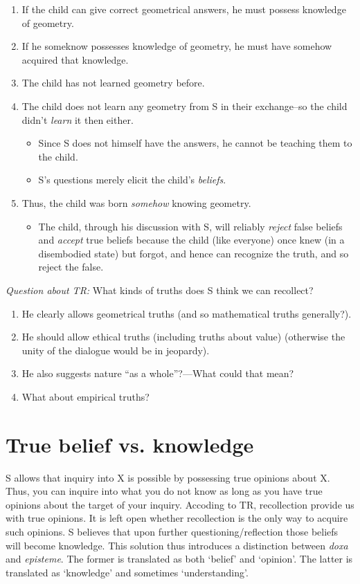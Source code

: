 \documentclass[10 pt]{article}
\begin{document}
\begin{enumerate}
\item If the child can give correct geometrical answers, he must possess knowledge of geometry. 
\item If he someknow possesses knowledge of geometry, he must have somehow acquired that knowledge.
\item The child has not learned geometry before. 
\item The child does not learn any geometry from S in their exchange--so the child didn't \emph{learn} it then either.
\begin{itemize}
\item Since S does not himself have the answers, he cannot be teaching them to the child. 
\item S's questions merely elicit the child's \emph{beliefs}. 
\end{itemize}
\item Thus, the child was born \emph{somehow} knowing geometry.
\begin{itemize}
\item The child, through his discussion with S, will reliably \emph{reject} false beliefs and \emph{accept} true beliefs because the child (like everyone) once knew (in a disembodied state) but forgot, and hence can recognize the truth, and so reject the false. 
\end{itemize} 
\end{enumerate}
\noindent \emph{Question about TR:} What kinds of truths does S think we can recollect?
\begin{enumerate}
\item He clearly allows geometrical truths (and so mathematical truths generally?). 
\item He should allow ethical truths (including truths about value) (otherwise the unity of the dialogue would be in jeopardy). 
\item He also suggests nature ``as a whole''?---What could that mean?\item What about empirical truths? 
\end{enumerate}
 
 

\section*{True belief vs. knowledge}
S allows that inquiry into X is possible by possessing true opinions about X. Thus, you can inquire into what you do not know as long as you have true opinions about the target of your inquiry. Accoding to TR, recollection provide us with true opinions. It is left open whether recollection is the only way to acquire such opinions. S believes that upon further questioning/reflection those beliefs will become knowledge. This solution thus introduces a distinction between \emph{doxa} and \emph{episteme}. The former is translated as both `belief' and `opinion'. The latter is translated as `knowledge' and sometimes `understanding'. 
\end{document}
